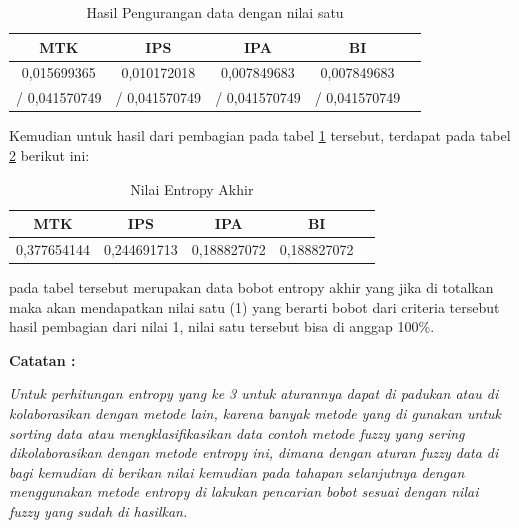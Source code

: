 \begin{table}[h]
\caption{Hasil Pengurangan data dengan nilai satu}
\centering
\begin{tabular}{|c|c|c|c|c|}
\hline
 MTK & IPS & IPA&BI\\
\hline
0,015699365&0,010172018&0,007849683&0,007849683\\
/ 0,041570749&/ 0,041570749&/ 0,041570749& / 0,041570749\\
\hline
\end{tabular}
\label{ts13}
\end{table}

Kemudian untuk hasil dari pembagian pada tabel \ref{ts13} tersebut, terdapat pada tabel \ref{ts14} berikut ini:

\begin{table}[h]
\caption{Nilai Entropy Akhir}
\centering
\begin{tabular}{|c|c|c|c|c|}
\hline
 MTK & IPS & IPA&BI\\
\hline
0,377654144&0,244691713&0,188827072&0,188827072\\
\hline
\end{tabular}
\label{ts14}
\end{table}
pada tabel tersebut merupakan data bobot entropy akhir yang jika di totalkan maka akan mendapatkan nilai satu (1) yang berarti bobot dari criteria tersebut hasil pembagian dari nilai 1, nilai satu tersebut bisa di anggap 100\%.

\pagebreak

\textbf{Catatan :}\par
\textit{Untuk perhitungan entropy yang ke 3 untuk aturannya dapat di padukan atau di kolaborasikan dengan metode lain, karena banyak metode yang di gunakan untuk sorting data atau mengklasifikasikan data contoh metode fuzzy yang sering dikolaborasikan dengan metode entropy ini, dimana dengan aturan fuzzy data di bagi kemudian di berikan nilai kemudian pada tahapan selanjutnya dengan menggunakan metode entropy di lakukan pencarian bobot sesuai dengan nilai fuzzy yang sudah di hasilkan.}



